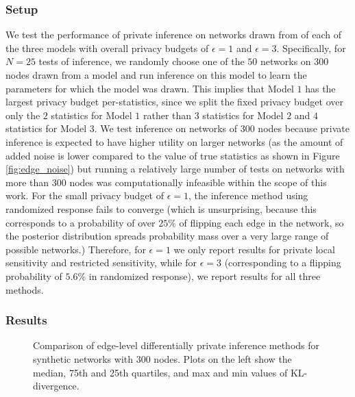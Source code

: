  \subsubsection{Setup}
 
 We test the performance of private inference on networks drawn from of each of the three models with overall privacy budgets of $\epsilon=1$ and $\epsilon=3$. Specifically, for $N=25$ tests of inference, we randomly choose one of the $50$ networks on $300$ nodes drawn from a model and run inference on this model to learn the parameters for which the model was drawn. This implies that Model $1$ has the largest privacy budget per-statistics, since we split the fixed privacy budget over only the $2$ statistics for Model $1$ rather than $3$ statistics for Model $2$ and $4$ statistics for Model $3$. We test inference on networks of $300$ nodes because private inference is expected to have higher utility on larger networks (as the amount of added noise is lower compared to the value of true statistics as shown in Figure \ref{fig:edge_noise}) but running a relatively large number of tests on networks with more than $300$ nodes was computationally infeasible within the scope of this work. For the small privacy budget of $\epsilon=1$, the inference method using randomized response fails to converge (which is unsurprising, because this corresponds to a probability of over $25\%$ of flipping each edge in the network, so the posterior distribution spreads probability mass over a very large range of possible networks.) Therefore, for $\epsilon=1$ we only report results for private local sensitivity and restricted sensitivity, while for $\epsilon = 3$ (corresponding to a flipping probability of $5.6\%$ in randomized response), we report results for all three methods.
 
 \subsubsection{Results}
  
 \begin{figure}[hp]
 	\caption{Comparison of edge-level differentially private inference methods for synthetic networks with $300$ nodes. Plots on the left show the median, 75th and 25th quartiles, and max and min values of KL-divergence.} 
 	\centering
 	
 	\label{fig:edgeinfsynth}
 \end{figure}
 
